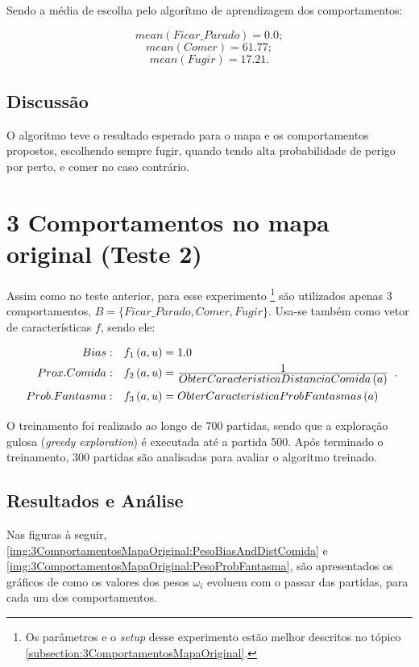 Sendo a média de escolha pelo algorítmo de aprendizagem dos comportamentos:

$$ mean \left( Ficar\_Parado \right) = 0.0; $$
$$ mean \left( Comer \right) = 61.77; $$
$$ mean \left( Fugir \right) = 17.21. $$


\subsection{Discussão}

O algoritmo teve o resultado esperado para o mapa e os comportamentos propostos, escolhendo sempre fugir, quando tendo alta probabilidade de perigo por perto, e comer no caso contrário.


\section{3 Comportamentos no mapa original (Teste 2)}

Assim como no teste anterior, para esse experimento%
\footnote{Os parâmetros e o \textit{setup} desse experimento estão melhor descritos no tópico \ref{subsection:3ComportamentosMapaOriginal}.%
} são utilizados apenas 3 comportamentos, $ B = \{Ficar\_Parado, Comer, Fugir\} $. Usa-se também como vetor de características $ f $, sendo ele:
\begin{equation}
	\renewcommand\arraystretch{1.5}
	\begin{array}{r l}
		Bias: & f_1 \left( a, u \right) = 1.0 \\
		Prox. Comida: & f_2 \left( a, u \right) = \frac{\displaystyle 1}{\displaystyle ObterCaracteristicaDistanciaComida \left( a \right)} \\
		Prob. Fantasma: & f_3 \left( a, u \right) = ObterCaracteristicaProbFantasmas \left( a \right)
	\end{array}.
\end{equation}

O treinamento foi realizado ao longo de 700 partidas, sendo que a exploração gulosa (\textit{greedy exploration}) é executada até a partida 500. Após terminado o treinamento, 300 partidas são analisadas para avaliar o algoritmo treinado.


\subsection{Resultados e Análise}

Nas figuras à seguir, \ref{img:3ComportamentosMapaOriginal:PesoBiasAndDistComida} e \ref{img:3ComportamentosMapaOriginal:PesoProbFantasma}, são apresentados os gráficos de como os valores dos pesos $ \omega_i $ evoluem com o passar das partidas, para cada um dos comportamentos.


